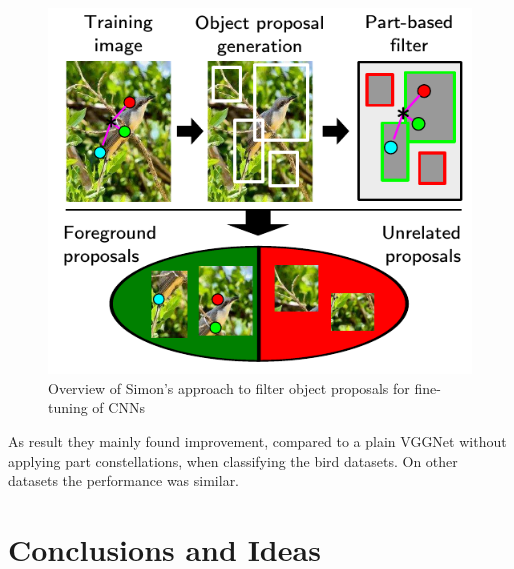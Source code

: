 \documentclass[electronic]{vgtc}             %
\begin{document}
		\begin{figure}[htbp]
			\includegraphics[width=.48\textwidth]{bird-norm}
			\caption{Overview of Simon's approach to filter object proposals for fine-tuning of CNNs\cite{Simon:2015}}
			\label{fig:bird-norm}
		\end{figure}
	
	As result they mainly found improvement, compared to a plain VGGNet without applying part constellations, when classifying the bird datasets.
	On other datasets the performance was similar.
	
	
	
	\section{Conclusions and Ideas}
	
	
	
	
	
	
	
\end{document}

